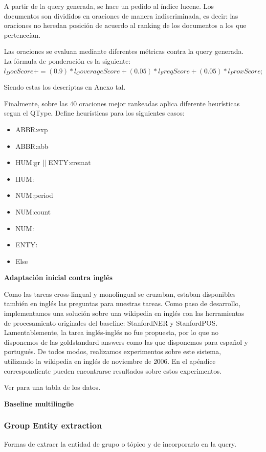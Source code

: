 A partir de la query generada, se hace un pedido al índice lucene. Los documentos son divididos en oraciones de manera indiscriminada, es decir: las oraciones no heredan posición de acuerdo al ranking de los documentos a los que pertenecían.

Las oraciones se evaluan mediante diferentes métricas contra la query generada. La fórmula de ponderación es la siguiente: \\
$l_DocScore += (0.9)*l_CoverageScore + (0.05)*l_FreqScore+ (0.05)*l_ProxScore;$

Siendo estas los descriptas en Anexo tal.

Finalmente, sobre las 40 oraciones mejor rankeadas aplica diferente heurísticas segun el QType.
Define heurísticas para los siguientes casos:
\begin{itemize}
  \item ABBR:exp
  \item ABBR:abb
	\item HUM:gr || ENTY:cremat
  \item HUM:
  \item NUM:period
  \item NUM:count
  \item NUM:
  \item ENTY:
  \item Else
\end{itemize}

\textbf{Adaptación inicial contra inglés}

Como las tareas cross-lingual y monolingual se cruzaban, estaban disponibles también en inglés las preguntas para nuestras tareas. 
Como paso de desarrollo, implementamos una solución sobre una wikipedia en inglés con las herramientas de procesamiento originales del baseline: StanfordNER y StanfordPOS. Lamentablemente, la tarea inglés-inglés no fue propuesta, por lo que no disponemos de las goldstandard answers como las que disponemos para español y portugués. De todos modos, realizamos experimentos sobre este sistema, utilizando la wikipedia en inglés de noviembre de 2006. En el apéndice correspondiente pueden encontrarse resultados sobre estos experimentos.

Ver  para una tabla de los datos.

\textbf{Baseline multilingüe}

\subsubsection{Group Entity extraction}
\label{subsubsec:entidad-de-grupo}
\falta
Formas de extraer la entidad de grupo o tópico y de incorporarlo en la query.
